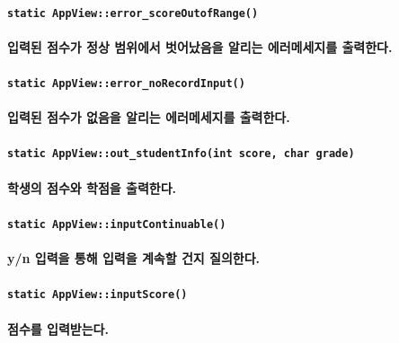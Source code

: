 \documentclass[UTF8]{report}
\begin{document}
            \paragraph{\texttt{static AppView::error\_scoreOutofRange()}}
            \paragraph{%
                \normalfont 입력된 점수가 정상 범위에서 벗어났음을 알리는 에러메세지를 출력한다.
            }

            \paragraph{\texttt{static AppView::error\_noRecordInput()}}
            \paragraph{%
                \normalfont 입력된 점수가 없음을 알리는 에러메세지를 출력한다.
            }

            \paragraph{\texttt{static AppView::out\_studentInfo(int score, char grade)}}
            \paragraph{%
                \normalfont 학생의 점수와 학점을 출력한다.
            }

            \paragraph{\texttt{static AppView::inputContinuable()}}
            \paragraph{%
                \normalfont y/n 입력을 통해 입력을 계속할 건지 질의한다.
            }

            \paragraph{\texttt{static AppView::inputScore()}}
            \paragraph{%
                \normalfont 점수를 입력받는다.
            }
\end{document}
